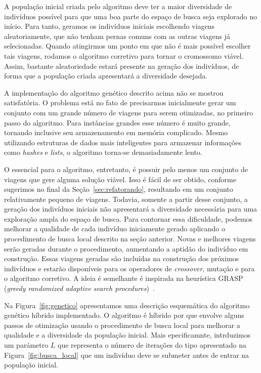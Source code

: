 A população inicial criada pelo algoritmo deve ter a maior diversidade de indivíduos possível para
que uma boa parte do espaço de busca seja explorado no início. Para tanto, geramos os indivíduos
iniciais escolhendo viagens aleatoriamente, que não tenham pernas comuns com as outras viagens já
selecionadas. Quando atingirmos um ponto em que não é mais possível escolher tais viagens, rodamos o
algoritmo corretivo para tornar o cromossomo viável. Assim, bastante aleatoriedade estará presente
na geração dos indivíduos, de forma que a população criada apresentará a diversidade desejada.

A implementação do algoritmo genético descrito acima não se mostrou satisfatória. O problema está no
fato de precisarmos inicialmente gerar um conjunto com um grande número de viagens para serem
otimizadas, no primeiro passo do algoritmo. Para instâncias grandes esse número é muito grande,
tornando inclusive seu armazenamento em memória complicado. Mesmo utilizando estruturas de dados
mais inteligentes para armazenar informações como {\it hashes} e {\it lists}, o algoritmo torna-se
demasiadamente lento.

O essencial para o algoritmo, entretanto, é possuir pelo menos um conjunto de viagens que gere
alguma solução viável. Isso é fácil de ser obtido, conforme sugerimos no final da
Seção~\ref{sec:refatorando}, resultando em um conjunto relativamente pequeno de viagens. Todavia,
somente a partir desse conjunto, a geração dos indivíduos iniciais não apresentará a diversidade
necessária para uma exploração ampla do espaço de busca. Para contornar essa dificuldade, podemos
melhorar a qualidade de cada indivíduo iniciamente gerado aplicando o procedimento de busca local
descrito na seção anterior. Novas e melhores viagens serão geradas durante o procedimento,
aumentando a aptidão do indivíduo em construção. Essas viagens geradas são incluídas na construção
dos próximos indivíduos e estarão disponíveis para os operadores de {\it crossover}, mutação e para
o algoritmo corretivo. A ideia é semelhante é inspirada na heurística GRASP ({\it greedy randomized
adaptive search procedures})~\cite{feo89, feo95}.

Na Figura~\ref{fig:genetico} apresentamos uma descrição esquemática do algoritmo genético híbrido
implementado. O algoritmo é híbrido por que envolve alguns passos de otimização usando o 
procedimento de busca local para melhorar a qualidade e a diversidade da população inicial. Mais
epecificamnte, intrduzimos um parámetro $L$ que representa o número de iterações do tipo apresentado
na Figura~\ref{fig:busca_local} que um indivíduo deve se submeter antes de entrar na população 
inicial.

